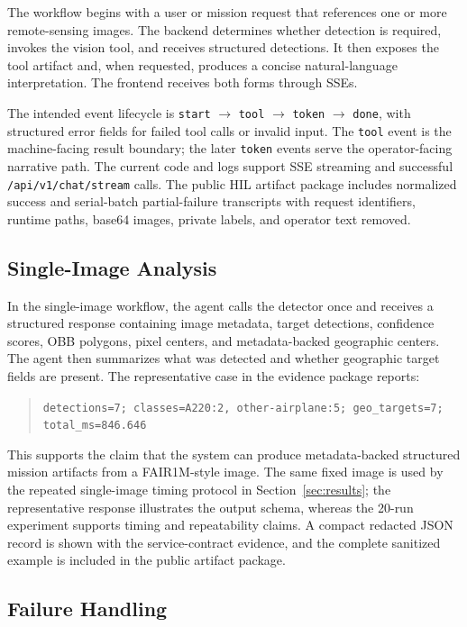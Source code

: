 \documentclass[10pt,letterpaper]{article}
\begin{document}
The workflow begins with a user or mission request that references one or more remote-sensing images. The backend determines whether detection is required, invokes the vision tool, and receives structured detections. It then exposes the tool artifact and, when requested, produces a concise natural-language interpretation. The frontend receives both forms through SSEs.

The intended event lifecycle is \texttt{start} $\rightarrow$ \texttt{tool} $\rightarrow$ \texttt{token} $\rightarrow$ \texttt{done}, with structured error fields for failed tool calls or invalid input. The \texttt{tool} event is the machine-facing result boundary; the later \texttt{token} events serve the operator-facing narrative path. The current code and logs support SSE streaming and successful \texttt{/api/v1/chat/stream} calls. The public HIL artifact package includes normalized success and serial-batch partial-failure transcripts with request identifiers, runtime paths, base64 images, private labels, and operator text removed.



\subsection{Single-Image Analysis}

In the single-image workflow, the agent calls the detector once and receives a structured response containing image metadata, target detections, confidence scores, OBB polygons, pixel centers, and metadata-backed geographic centers. The agent then summarizes what was detected and whether geographic target fields are present. The representative case in the evidence package reports:
\begin{quote}
\texttt{detections=7; classes=A220:2, other-airplane:5; geo\_targets=7; total\_ms=846.646}
\end{quote}
This supports the claim that the system can produce metadata-backed structured mission artifacts from a FAIR1M-style image. The same fixed image is used by the repeated single-image timing protocol in Section~\ref{sec:results}; the representative response illustrates the output schema, whereas the 20-run experiment supports timing and repeatability claims. A compact redacted JSON record is shown with the service-contract evidence, and the complete sanitized example is included in the public artifact package.

\subsection{Failure Handling}
\end{document}
